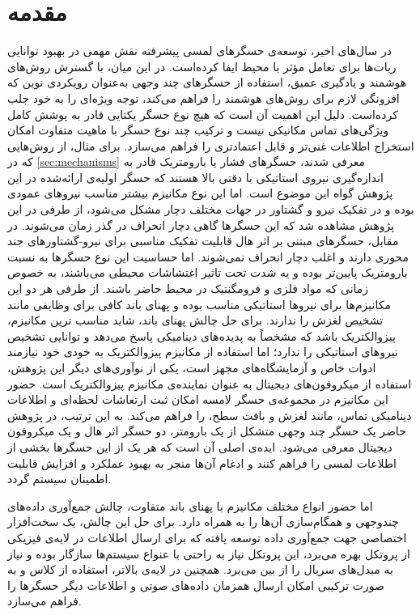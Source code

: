 \section{مقدمه} 
در سال‌های اخیر، توسعه‌ی حسگرهای لمسی پیشرفته نقش مهمی در بهبود توانایی ربات‌ها برای تعامل مؤثر با محیط ایفا کرده‌است. در این میان، با گسترش روش‌های هوشمند و یادگیری عمیق، استفاده از حسگرهای چند وجهی به‌عنوان رویکردی نوین که افزونگی لازم برای روش‌های هوشمند را فراهم می‌کند، توجه ویژه‌ای را به خود جلب کرده‌است. دلیل این اهمیت آن است که هیچ نوع حسگر یکتایی قادر به پوشش کامل ویژگی‌های تماس مکانیکی نیست و ترکیب چند نوع حسگر با ماهیت متفاوت امکان استخراج اطلاعات غنی‌تر و قابل اعتمادتری را فراهم می‌سازد. برای مثال، از روش‌هایی که در 
\ref{sec:mechanisms}
معرفی شدند، حسگرهای فشار یا بارومتریک قادر به اندازه‌گیری نیروی استاتیکی با دقتی بالا هستند که حسگر اولیه‌ی ارائه‌شده در این پژوهش
\cite{sheykh2025Design}
گواه این موضوع است. اما این نوع مکانیزم بیشتر مناسب نیرو‌های عمودی بوده و در تفکیک نیرو و گشتاور در جهات مختلف دچار مشکل می‌شود، از طرفی در این پژوهش مشاهده شد که این حسگر‌ها گاهی دچار انحراف
 در گذر زمان می‌شوند. در مقابل، حسگر‌های مبتنی بر اثر هال قابلیت تفکیک مناسبی برای نیرو-گشتاور‌های جند محوری دارند و اغلب دچار انحراف نمی‌شوند. اما حساسیت این نوع حسگر‌ها به نسبت بارومتریک پایین‌تر بوده و یه شدت تحت تاثیر اغتشاشات محیطی می‌باشند، به خصوص زمانی که مواد فلزی و فرومگنتیک
 در محیط حاضر باشند. از طرفی هر دو این مکانیزم‌ها برای نیرو‌ها استاتیکی مناسب بوده و پهنای باند کافی برای وظایفی مانند تشخیص لغزش را ندارند. برای حل چالش پهنای باند، شاید مناسب ترین مکانیزم، پیزوالکتریک باشد که مشخصاً به پدیده‌های دینامیکی پاسخ می‌دهد و توانایی تشخیص نیرو‌های استاتیکی را ندارد؛ اما استفاده از مکانیزم پیزوالکتریک به خودی خود نیازمند ادوات خاص و آزمایشگاه‌های مجهز است، یکی از نوآوری‌های دیگر این پژوهش، استفاده از میکروفون‌های دیجیتال 
 به عنوان نماینده‌ی مکانیزم پیزوالکتریک است. حضور این مکانیزم در مجموعه‌ی حسگر لامسه امکان ثبت ارتعاشات لحظه‌ای و اطلاعات دینامیکی تماس، مانند لغزش و بافت سطح، را فراهم می‌کند. 
 به این ترتیب، در پژوهش حاضر یک حسگر چند وجهی متشکل از یک بارومتر، دو حسگر اثر هال و یک میکروفون دیجیتال  معرفی می‌شود. ایده‌ی اصلی آن است که هر یک از این حسگرها بخشی از اطلاعات لمسی را فراهم کنند و ادغام آن‌ها منجر به بهبود عملکرد و افزایش قابلیت اطمینان سیستم گردد.
  
 اما حضور انواع مختلف مکانیزم با پهنای باند متفاوت، چالش جمع‌آوری داده‌های چندوجهی و همگام‌سازی آن‌ها را به همراه دارد. برای حل این چالش، یک سخت‌افزار اختصاصی جهت جمع‌آوری داده توسعه یافته که برای ارسال اطلاعات در لایه‌ی فیزیکی از پروتکل 
 بهره می‌برد، این پروتکل نیاز به راحتی با عنواع سیستم‌ها سازگار بوده و نیاز به مبدل‌های سریال را از بین می‌برد. همچنین در لایه‌ی بالاتر، استفاده از کلاس
 و
  به صورت ترکیبی امکان ارسال همزمان داده‌های صوتی و اطلاعات دیگر حسگر‌ها را فراهم می‌سازد.

